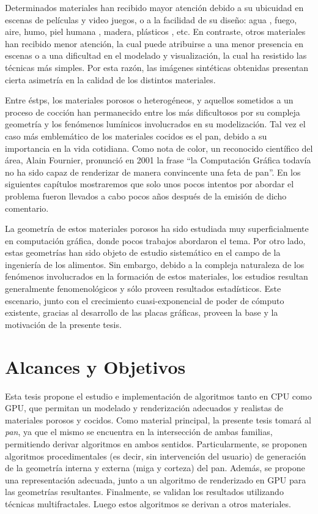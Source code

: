 Determinados materiales han recibido mayor atención debido a su ubicuidad en escenas de películas y video juegos, o a la facilidad de su diseño: agua \cite{Schechter2012}, fuego, aire, humo, piel humana \cite{Donner2006}, madera, plásticos \cite{Kurt2010}, etc.
En contraste, otros materiales han recibido menor atención, la cual puede atribuirse a una menor presencia en escenas o a una dificultad en el modelado y visualización, la cual ha resistido las técnicas más simples.
Por esta razón, las imágenes sintéticas obtenidas presentan cierta asimetría en la calidad de los distintos materiales.

Entre éstps, los materiales porosos o heterogéneos, y aquellos sometidos a un proceso de cocción han permanecido entre los más dificultosos por su compleja geometría y los fenómenos lumínicos involucrados en su modelización.
Tal vez el caso más emblemático de los materiales cocidos es el pan, debido a su importancia en la vida cotidiana.
Como nota de color, un reconocido  científico del área, Alain Fournier, pronunció en 2001 la frase ``la Computación Gráfica todavía no ha sido capaz de renderizar de manera convincente una feta de pan''.
En los siguientes capítulos mostraremos que solo unos pocos intentos por abordar el problema fueron llevados a cabo pocos años después de la emisión de dicho comentario.

La geometría de estos materiales porosos ha sido estudiada muy superficialmente en computación gráfica, donde pocos trabajos abordaron el tema.
Por otro lado, estas geometrías han sido objeto de estudio sistemático en el campo de la ingeniería de los alimentos.
Sin embargo, debido a la compleja naturaleza de los fenómenos involucrados en la formación de estos materiales, los estudios resultan generalmente fenomenológicos y sólo proveen resultados estadísticos.
Este escenario, junto con el crecimiento cuasi-exponencial de poder de cómputo existente, gracias al desarrollo de las placas gráficas, proveen la base y la motivación de la presente tesis.

\section{Alcances y Objetivos}
Esta tesis propone el estudio e implementación de algoritmos tanto en CPU como GPU, que permitan un modelado y renderización adecuados y realistas de materiales porosos y cocidos.
Como material principal, la presente tesis tomará al {\em pan}, ya que el mismo se encuentra en la intersección de ambas familias, permitiendo derivar algoritmos en ambos sentidos.
Particularmente, se proponen algoritmos procedimentales (es decir, sin intervención del usuario) de generación de la geometría interna y externa (miga y corteza) del pan.
Además, se propone una representación adecuada, junto a un algoritmo de renderizado en GPU para las geometrías resultantes.
Finalmente, se validan los resultados utilizando técnicas multifractales.
Luego estos algoritmos se derivan a otros materiales.

